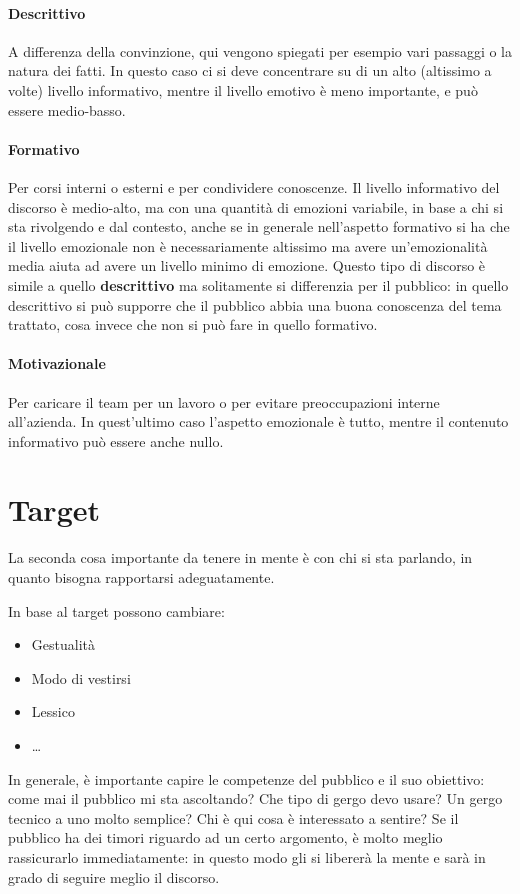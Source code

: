 \paragraph*{Descrittivo} A differenza della convinzione, qui vengono spiegati
per esempio vari passaggi o la natura dei fatti. In questo caso ci si deve
concentrare su di un alto (altissimo a volte) livello informativo, mentre il
livello emotivo è meno importante, e può essere medio-basso.

\paragraph*{Formativo} Per corsi interni o esterni e per condividere conoscenze.
Il livello informativo del discorso è medio-alto, ma con una quantità di emozioni
variabile, in base a chi si sta rivolgendo e dal contesto, anche se in generale
nell'aspetto formativo si ha che il livello emozionale non è necessariamente
altissimo ma avere un'emozionalità media aiuta ad avere un livello minimo di
emozione. Questo tipo di discorso è simile a quello \textbf{descrittivo} ma
solitamente si differenzia per il pubblico: in quello descrittivo si può
supporre che il pubblico abbia una buona conoscenza del tema trattato, cosa
invece che non si può fare in quello formativo.

\paragraph*{Motivazionale} Per caricare il team per un lavoro o per evitare
preoccupazioni interne all'azienda. In quest'ultimo caso l'aspetto emozionale è
tutto, mentre il contenuto informativo può essere anche nullo.

\section{Target}
La seconda cosa importante da tenere in mente è con chi si sta parlando, in
quanto bisogna rapportarsi adeguatamente.

In base al target possono cambiare:
\begin{itemize}
 \item Gestualità
 \item Modo di vestirsi
 \item Lessico
 \item \dots
\end{itemize}

In generale, è importante capire le competenze del pubblico e il suo obiettivo:
come mai il pubblico mi sta ascoltando? Che tipo di gergo devo usare? Un gergo
tecnico a uno molto semplice? Chi è qui cosa è interessato a sentire? Se il
pubblico ha dei timori riguardo ad un certo argomento, è molto meglio
rassicurarlo immediatamente: in questo modo gli si libererà la mente e sarà in
grado di seguire meglio il discorso.

